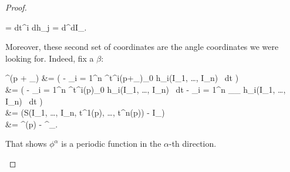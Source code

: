 \documentclass[main.tex]{subfiles}
\begin{document}
\begin{proof}
\begin{enumerate}
		\begin{eqalign}
			\omega = dt^i \wedge dh_j = d\phi^\alpha \wedge dI_\alpha.
		\end{eqalign}
		Moreover, these second set of coordinates are the angle coordinates we were looking for. Indeed, fix a $\beta$:
		\begin{eqalign}
			\phi^\alpha(p + \gamma_\beta) &=  \left( - \sum_{i = 1}^n \int^{t^i(p+\gamma_\beta)}_{0} h_i(I_1, \ldots, I_n) \, dt \right)\\
			&=  \left( - \sum_{i = 1}^n \int^{t^i(p)}_{0} h_i(I_1, \ldots, I_n) \, dt  - \sum_{i = 1}^n \int_{\gamma_\beta} h_i(I_1, \ldots, I_n) \, dt \right)\\
			&=  (S(I_1, \ldots, I_n, t^1(p), \ldots, t^n(p)) - I_\beta)\\
			&= \phi^\alpha(p) - \delta^\alpha_\beta.
		\end{eqalign}
		That shows $\phi^\alpha$ is a periodic function in the $\alpha$-th direction.
	\end{enumerate}
\end{proof}
\end{document}
